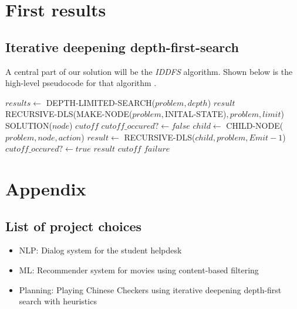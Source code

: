 \documentclass[a4paper,11pt]{report}
\begin{document}
\chapter{First results}
\section{Iterative deepening depth-first-search}
A central part of our solution will be the \emph{IDDFS} algorithm.
Shown below is the 
high-level pseudocode for that algorithm \cite{aimodern}.\\
\begin{algorithmic}
\State $results \gets$ DEPTH-LIMITED-SEARCH($problem, depth$)
\State \Return $result$
\EndIf
\EndFor
\EndFunction
\\
\State \Return RECURSIVE-DLS(MAKE-NODE($problem, $INITAL-STATE)$,problem, limit$)
\EndFunction
\\
\State \Return SOLUTION($node$)
\State \Return $cutoff$
\Else
\State $cutoff\_occured? \gets false$
\State $child \gets$ CHILD-NODE($problem, node, action$)
\State $result \gets$ RECURSIVE-DLS($child, problem, Emit - 1$)
\State $cutoff\_occured? \gets true$
\State \Return $result$
\EndIf
\EndFor
{}
\Return $cutoff$
\Else
\Return $failure$
\EndIf
\EndIf
\EndFunction
\end{algorithmic}


\chapter{Appendix}
\section{List of project choices}
\begin{itemize}
\item NLP: Dialog system for the student helpdesk 
\item ML: Recommender system for movies using content-based filtering
\item Planning: Playing Chinese Checkers using iterative deepening depth-first search with heuristics
\end{itemize}






\end{document}
